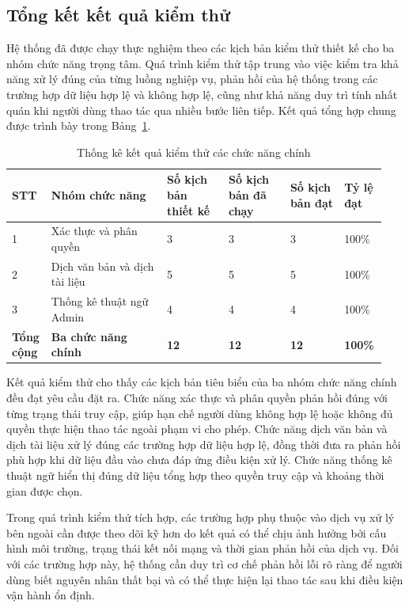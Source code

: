 ﻿\documentclass[../DoAn.tex]{subfiles}
\begin{document}
\subsection{Tổng kết kết quả kiểm thử}

Hệ thống đã được chạy thực nghiệm theo các kịch bản kiểm thử thiết kế cho ba nhóm chức năng trọng tâm. Quá trình kiểm thử tập trung vào việc kiểm tra khả năng xử lý đúng của từng luồng nghiệp vụ, phản hồi của hệ thống trong các trường hợp dữ liệu hợp lệ và không hợp lệ, cũng như khả năng duy trì tính nhất quán khi người dùng thao tác qua nhiều bước liên tiếp. Kết quả tổng hợp chung được trình bày trong Bảng~\ref{table:test-main-summary}.

\begin{table}[htbp]
\centering
\caption{Thống kê kết quả kiểm thử các chức năng chính}
\label{table:test-main-summary}
\small
\setlength{\tabcolsep}{3pt}
\renewcommand{\arraystretch}{1.16}
\begin{tabular}{|p{0.07\linewidth}|p{0.30\linewidth}|p{0.16\linewidth}|p{0.16\linewidth}|p{0.14\linewidth}|p{0.11\linewidth}|}
\hline
\textbf{STT} & \textbf{Nhóm chức năng} & \textbf{Số kịch bản thiết kế} & \textbf{Số kịch bản đã chạy} & \textbf{Số kịch bản đạt} & \textbf{Tỷ lệ đạt} \\ \hline
1 & Xác thực và phân quyền & 3 & 3 & 3 & 100\% \\ \hline
2 & Dịch văn bản và dịch tài liệu & 5 & 5 & 5 & 100\% \\ \hline
3 & Thống kê thuật ngữ Admin & 4 & 4 & 4 & 100\% \\ \hline
\textbf{Tổng cộng} & \textbf{Ba chức năng chính} & \textbf{12} & \textbf{12} & \textbf{12} & \textbf{100\%} \\ \hline
\end{tabular}
\end{table}

Kết quả kiểm thử cho thấy các kịch bản tiêu biểu của ba nhóm chức năng chính đều đạt yêu cầu đặt ra. Chức năng xác thực và phân quyền phản hồi đúng với từng trạng thái truy cập, giúp hạn chế người dùng không hợp lệ hoặc không đủ quyền thực hiện thao tác ngoài phạm vi cho phép. Chức năng dịch văn bản và dịch tài liệu xử lý đúng các trường hợp dữ liệu hợp lệ, đồng thời đưa ra phản hồi phù hợp khi dữ liệu đầu vào chưa đáp ứng điều kiện xử lý. Chức năng thống kê thuật ngữ hiển thị đúng dữ liệu tổng hợp theo quyền truy cập và khoảng thời gian được chọn.

Trong quá trình kiểm thử tích hợp, các trường hợp phụ thuộc vào dịch vụ xử lý bên ngoài cần được theo dõi kỹ hơn do kết quả có thể chịu ảnh hưởng bởi cấu hình môi trường, trạng thái kết nối mạng và thời gian phản hồi của dịch vụ. Đối với các trường hợp này, hệ thống cần duy trì cơ chế phản hồi lỗi rõ ràng để người dùng biết nguyên nhân thất bại và có thể thực hiện lại thao tác sau khi điều kiện vận hành ổn định.
\end{document}
